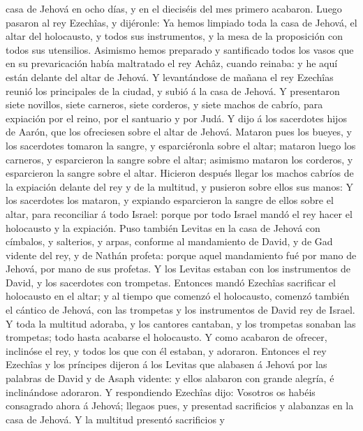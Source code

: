 casa de Jehová en ocho días, y en el dieciséis del mes primero acabaron.
 Luego pasaron al rey Ezechîas, y dijéronle: Ya hemos
limpiado toda la casa de Jehová, el altar del holocausto, y todos sus
instrumentos, y la mesa de la proposición con todos sus utensilios.
 Asimismo hemos preparado y santificado todos los vasos que
en su prevaricación había maltratado el rey Achâz, cuando reinaba: y he
aquí están delante del altar de Jehová.  Y levantándose de
mañana el rey Ezechîas reunió los principales de la ciudad, y subió á la
casa de Jehová.  Y presentaron siete novillos, siete
carneros, siete corderos, y siete machos de cabrío, para expiación por
el reino, por el santuario y por Judá. Y dijo á los sacerdotes hijos de
Aarón, que los ofreciesen sobre el altar de Jehová. 
Mataron pues los bueyes, y los sacerdotes tomaron la sangre, y
esparciéronla sobre el altar; mataron luego los carneros, y esparcieron
la sangre sobre el altar; asimismo mataron los corderos, y esparcieron
la sangre sobre el altar.  Hicieron después llegar los
machos cabríos de la expiación delante del rey y de la multitud, y
pusieron sobre ellos sus manos:  Y los sacerdotes los
mataron, y expiando esparcieron la sangre de ellos sobre el altar, para
reconciliar á todo Israel: porque por todo Israel mandó el rey hacer el
holocausto y la expiación.  Puso también Levitas en la casa
de Jehová con címbalos, y salterios, y arpas, conforme al mandamiento de
David, y de Gad vidente del rey, y de Nathán profeta: porque aquel
mandamiento fué por mano de Jehová, por mano de sus profetas.
 Y los Levitas estaban con los instrumentos de David, y los
sacerdotes con trompetas.  Entonces mandó Ezechîas
sacrificar el holocausto en el altar; y al tiempo que comenzó el
holocausto, comenzó también el cántico de Jehová, con las trompetas y
los instrumentos de David rey de Israel.  Y toda la
multitud adoraba, y los cantores cantaban, y los trompetas sonaban las
trompetas; todo hasta acabarse el holocausto.  Y como
acabaron de ofrecer, inclinóse el rey, y todos los que con él estaban, y
adoraron.  Entonces el rey Ezechîas y los príncipes dijeron
á los Levitas que alabasen á Jehová por las palabras de David y de Asaph
vidente: y ellos alabaron con grande alegría, é inclinándose adoraron.
 Y respondiendo Ezechîas dijo: Vosotros os habéis
consagrado ahora á Jehová; llegaos pues, y presentad sacrificios y
alabanzas en la casa de Jehová. Y la multitud presentó sacrificios y
